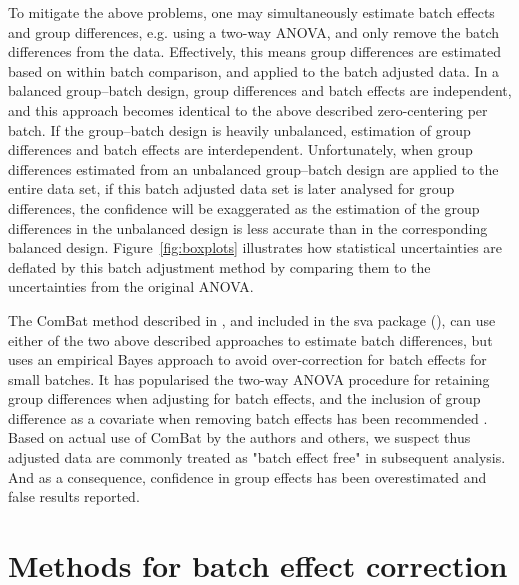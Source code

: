 \documentclass{bio}
\begin{document}
To mitigate the above problems, one may simultaneously estimate batch effects and group differences, e.g. using a two-way ANOVA, and only remove the batch differences from the data. Effectively, this means group differences are estimated based on within batch comparison, and applied to the batch adjusted data. In a balanced group--batch design, group differences and batch effects are independent, and this approach becomes identical to the above described zero-centering per batch. If the group--batch design is heavily unbalanced, estimation of group differences and batch effects are interdependent. Unfortunately, when group differences estimated from an unbalanced group--batch design are applied to the entire data set, if this batch adjusted data set is later analysed for group differences, the confidence will be exaggerated as the estimation of the group differences in the unbalanced design is less accurate than in the corresponding balanced design. Figure~\ref{fig:boxplots} illustrates how statistical uncertainties are deflated by this batch adjustment method by comparing them to the uncertainties from the original ANOVA.

The ComBat method described in \citet{Johnson2007}, and included in the sva package (\citealp{Leek2012}), can use either of the two above described approaches to estimate batch differences, but uses an empirical Bayes approach to avoid over-correction for batch effects for small batches. It has popularised the two-way ANOVA procedure for retaining group differences when adjusting for batch effects, and the inclusion of group difference as a covariate when removing batch effects has been recommended . Based on actual use of ComBat by the authors and others, we suspect thus adjusted data are commonly treated as "batch effect free" in subsequent analysis. And as a consequence, confidence in group effects has been overestimated and false results reported.






\section{Methods for batch effect correction}
\end{document}
